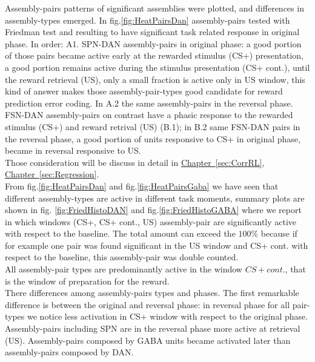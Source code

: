 Assembly-pairs patterns of significant assemblies were plotted, and differences in assembly-types emerged. In fig.\ref{fig:HeatPairsDan} assembly-pairs tested with Friedman test and resulting to have significant task related response in original phase. In order: A1. SPN-DAN assembly-pairs in original phase: a good portion of those pairs became active early at the rewarded stimulus (CS+) presentation, a good portion remains active during the stimulus presentation (CS+ cont.), until the reward retrieval (US), only a small fraction is active only in US window, this kind of answer makes those assembly-pair-types good candidate for reward prediction error coding. In A.2 the same assembly-pairs in the reversal phase. FSN-DAN assembly-pairs on contrast have a phasic response to the rewarded stimulus (CS+) and reward retrival (US) (B.1); in B.2 same FSN-DAN pairs in the reversal phase, a good portion of units responsive to CS+ in original phase, became in reversal responsive to US.\\ %
Those consideration will be discuss in detail in \hyperref[sec:CorrRL]{Chapter~\ref*{sec:CorrRL}}, \hyperref[sec:Regression]{Chapter~\ref*{sec:Regression}}.\\From fig.\ref{fig:HeatPairsDan} and fig.\ref{fig:HeatPairsGaba} we have seen that different assembly-types are active in different task moments, summary plots are shown in fig. \ref{fig:FriedHistoDAN} and fig.\ref{fig:FriedHistoGABA} where we report in which windows (CS+, CS+ cont., US) assembly-pair are significantly active with respect to the baseline. The total amount can exceed the $100\%$ because if for example one pair was found significant in the US window and CS+ cont. with respect to the baseline, this assembly-pair was double counted.\\All assembly-pair types are predominantly active in the window $CS+ cont.$, that is the window of preparation for the reward.\\There differences among assembly-pairs types and phases. The first remarkable difference is between the original and reversal phase: in reversal phase for all pair-types we notice less activation in CS+ window with respect to the original phase. Assembly-pairs including SPN are in the reversal phase more active at retrieval (US). Assembly-pairs composed by GABA units became activated later than assembly-pairs composed by DAN.
